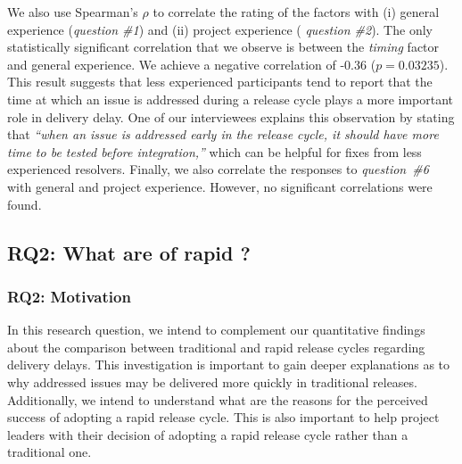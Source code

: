 \begin{sloppypar}
We also use Spearman's $\rho$ to correlate the rating of the factors with (i)
general experience ({\em question \#1}) and (ii) project experience ({\em
question \#2}). The only statistically significant correlation that we observe is
between the {\em timing} factor and general experience. We achieve a negative
correlation of -0.36 ($p=0.03235$). This result suggests that less
experienced participants tend to report that the time at which an issue is
addressed during a release cycle plays a more important role in delivery
delay. One of our interviewees explains this observation by stating that {\em
``when an issue is addressed early in the release cycle, it should have more
time to be tested before integration,''} which can be helpful for fixes
from less experienced resolvers. Finally, we also correlate the responses
to {\em question~\#6} with general and project experience. However, no
significant correlations were found.\\
\end{sloppypar}


\subsection{RQ2: What are \DIFdelbegin {}\DIFdelend \DIFaddbegin {}\DIFaddend of \DIFdelbegin {}\DIFdelend rapid
\DIFdelbegin {}\DIFdelend \DIFaddbegin {}\DIFaddend ?}\label{ch5:rq2}

\subsubsection*{RQ2: Motivation}

In this research question, we intend to complement our quantitative findings
about the comparison between traditional and rapid release cycles regarding
delivery delays. This investigation is important to gain deeper explanations as
to why addressed issues may be delivered more quickly in traditional releases.
Additionally, we intend to understand what are the reasons for the perceived
success of adopting a rapid release cycle. This is also important to help
project leaders with their decision of adopting a rapid release cycle rather
than a traditional one. \\


